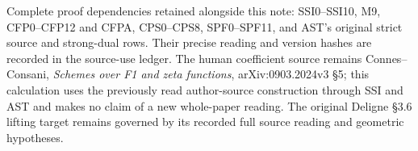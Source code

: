 Complete proof dependencies retained alongside this note: SSI0--SSI10,
M9, CFP0--CFP12 and CFPA, CPS0--CPS8, SPF0--SPF11, and AST's original
strict source and strong-dual rows. Their precise reading and version
hashes are recorded in the source-use ledger. The human coefficient
source remains Connes--Consani, \emph{Schemes over F1 and zeta
functions}, arXiv:0903.2024v3 §5; this calculation uses the previously
read author-source construction through SSI and AST and makes no claim
of a new whole-paper reading. The original Deligne §3.6 lifting target
remains governed by its recorded full source reading and geometric
hypotheses.
